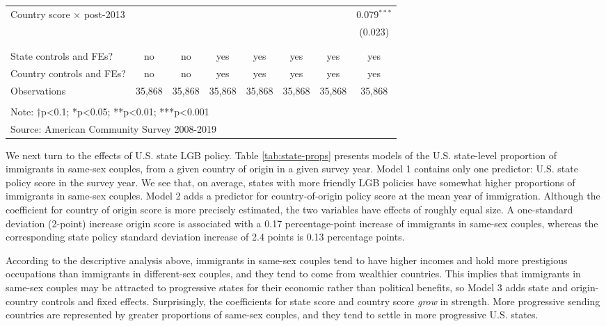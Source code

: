 \documentclass[
  11pt,
]{article}
\begin{document}
\begin{table}[!htbp]
\begin{tabular}{@{\extracolsep{5pt}}lccccccc}
 Country score × post-2013 &  &  &  &  &  &  & 0.079$^{***}$ \\ 
  &  &  &  &  &  &  & (0.023) \\ 
  & & & & & & & \\ 
\hline \\[-1.8ex] 
State controls and FEs? & no & no & yes & yes & yes & yes & yes \\ 
Country controls and FEs? & no & no & yes & yes & yes & yes & yes \\ 
Observations & 35,868 & 35,868 & 35,868 & 35,868 & 35,868 & 35,868 & 35,868 \\ 
\hline 
\hline \\[-1.8ex] 
\multicolumn{8}{l}{Note: †p<0.1; *p<0.05; **p<0.01; ***p<0.001} \\ 
\multicolumn{8}{l}{Source: American Community Survey 2008-2019} \\ 
\end{tabular} 
\end{table}

We next turn to the effects of U.S. state LGB policy. Table \ref{tab:state-props} presents models of the U.S. state-level proportion of immigrants in same-sex couples, from a given country of origin in a given survey year. Model 1 contains only one predictor: U.S. state policy score in the survey year. We see that, on average, states with more friendly LGB policies have somewhat higher proportions of immigrants in same-sex couples. Model 2 adds a predictor for country-of-origin policy score at the mean year of immigration. Although the coefficient for country of origin score is more precisely estimated, the two variables have effects of roughly equal size. A one-standard deviation (2-point) increase origin score is associated with a 0.17 percentage-point increase of immigrants in same-sex couples, whereas the corresponding state policy standard deviation increase of 2.4 points is 0.13 percentage points.

According to the descriptive analysis above, immigrants in same-sex couples tend to have higher incomes and hold more prestigious occupations than immigrants in different-sex couples, and they tend to come from wealthier countries. This implies that immigrants in same-sex couples may be attracted to progressive states for their economic rather than political benefits, so Model 3 adds state and origin-country controls and fixed effects. Surprisingly, the coefficients for state score and country score \emph{grow} in strength. More progressive sending countries are represented by greater proportions of same-sex couples, and they tend to settle in more progressive U.S. states.
\end{document}
